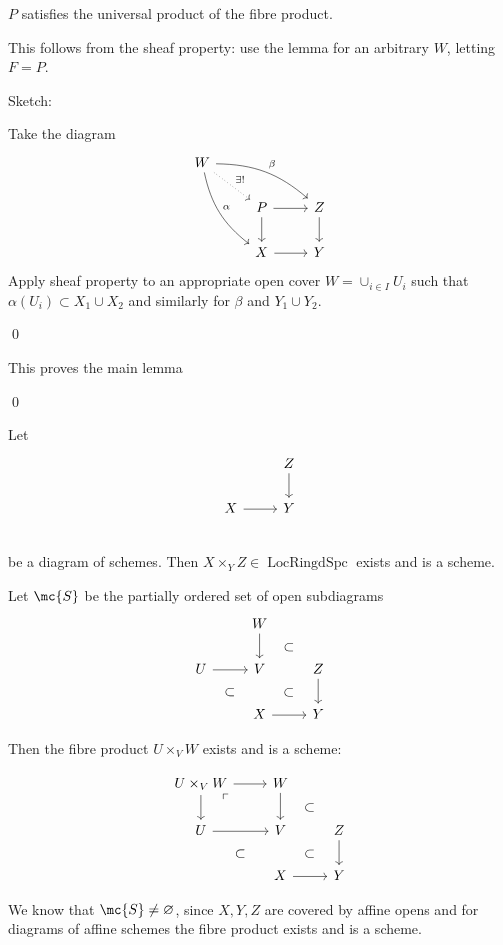 \documentclass[x11names,reqno,14pt]{extarticle}
\DeclareMathOperator{\LRS}{LocRingdSpc}
\begin{document}
$P$ satisfies the universal product of the fibre product. 

\proof

This follows from the sheaf property: use the lemma for an arbitrary $W$, letting $F = P$. 

Sketch:

Take the diagram
\[
\begin{tikzcd}
W \ar[drr, bend left = 20, "\beta"] \ar[ddr, bend right = 20, "\alpha"]\ar[dr, dotted, "\exists!"] \\
& P \ar[r] \ar[d] & Z \ar[d] \\
& X \ar[r] & Y 
\end{tikzcd}
\]
Apply sheaf property to an appropriate open cover $W = \cup_{i\in I}U_i$ such that $\alpha(U_i) \subset X_1\cup X_2$ and similarly for $\beta$ and $Y_1\cup Y_2$. 

\qed

This proves the main lemma

\qed

\thm

Let 
\[
\begin{tikzcd}
& Z \ar[d] \\
X \ar[r] & Y \\
\end{tikzcd}
\]
be a diagram of schemes. Then $X\times_YZ \in \LRS$ exists and is a scheme. 

\proof

Let $\mc{S}$ be the partially ordered set of open subdiagrams
\[
\begin{tikzcd}
& W \ar[dr, phantom, "\subset"] \ar[d] & \\
U \ar[r] \ar[dr, phantom, "\subset"] & V \ar[dr, phantom, "\subset"] & Z \ar[d] \\
& X \ar[r] & Y
\end{tikzcd}
\]

Then the fibre product $U\times_VW$ exists and is a scheme: 

\[
\begin{tikzcd}
U\times_VW \ar[r] \ar[dr,phantom,"\ulcorner", very near start]\ar[d] & W \ar[dr, phantom, "\subset"] \ar[d] & \\
U \ar[r] \ar[dr, phantom, "\subset"] & V \ar[dr, phantom, "\subset"] & Z \ar[d] \\
& X \ar[r] & Y
\end{tikzcd}
\]

We know that $\mc{S} \neq \varnothing$, since $X,Y,Z$ are covered by affine opens and for diagrams of affine schemes the fibre product exists and is a scheme. 
\end{document}

